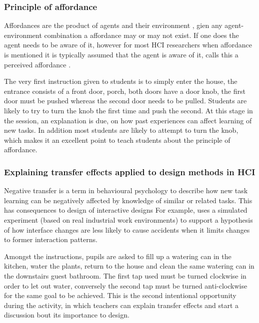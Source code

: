 \documentclass{sig-alternate}
\begin{document}
\subsubsection*{Principle of affordance}

Affordances are the product of agents and their environment
\cite{gibson1977theory}, gien any agent-environment combination a
affordance may or may not exist. If one does the agent needs to be
aware of it, however for most HCI researchers when affordance is
mentioned it is typically assumed that the agent is aware of it, calls
this a perceived affordance \cite{norman1999affordance}.

The very first instruction given to students is to simply enter the
house, the entrance consists of a front door, porch, both doors have a
door knob, the first door must be pushed whereas the second door needs
to be pulled. Students are likely to try to turn the knob the first
time and push the second. At this stage in the session, an explanation
is due, on how past experiences can affect learning of new tasks. In
addition most students are likely to attempt to turn the knob, which
makes it an excellent point to teach students about the principle of
affordance.


\subsubsection*{Explaining transfer effects applied to design methods
  in HCI}

Negative transfer\cite{Lunchin, Pan2010, Woltz} is a term in
behavioural psychology to describe how new task learning can be
negatively affected by knowledge of similar or related tasks.  This
has consequences to design of interactive designs
\cite{waern1993varieties} For example,\cite{Besnard2005105} uses a
simulated experiment (based on real industrial work environments) to
support a hypothesis of how interface changes are less likely to cause
accidents when it limits changes to former interaction patterns.

Amongst the instructions, pupils are asked to fill up a watering can
in the kitchen, water the plants, return to the house and clean the
same watering can in the downstairs guest bathroom. The first tap used
must be turned clockwise in order to let out water, conversely the
second tap must be turned anti-clockwise for the same goal to be
achieved. This is the second intentional opportunity during the
activity, in which teachers can explain transfer effects and start a
discussion bout its importance to design.
\end{document}
